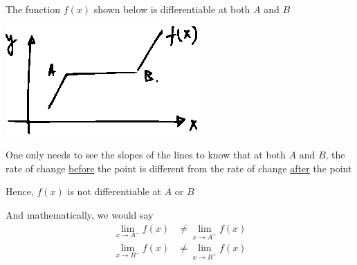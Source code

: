 \documentclass[14pt,fleqn]{extarticle}
\begin{document}
 
\begin{snippet}
    
    \incorrect
    
    The function $f(x)$ shown below is differentiable at both $A$ and $B$ 
    
    \begin{center}
\includegraphics[scale=1.5]{figure.eps}
\end{center}
    
    \reason
    
    One only needs to see the slopes of the lines to know that at both $A$ and $B$, the rate of change \underline{before} the point 
    is different from the rate of change \underline{after} the point\newline 
    
    Hence, $f(x)$ is not differentiable at $A$ or $B$ \newline 
    
    And mathematically, we would say 
    \begin{align}
	\lim_{x\to A^-} f(x) &\neq \lim_{x\to A^+} f(x) \\
	\lim_{x\to B^-} f(x) &\neq \lim_{x\to B^+} f(x) 
\end{align}
\end{snippet} 
\end{document}
